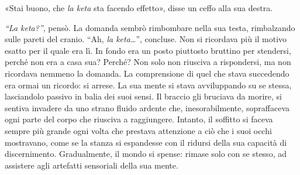 «Stai buono, che \textit{la keta} sta facendo effetto», disse un ceffo alla sua destra.

\textit{``La keta?''}, pensò. La domanda sembrò rimbombare nella sua testa, rimbalzando sulle pareti del cranio. ``Ah, \textit{la keta\ldots}'', concluse. Non si ricordava più il motivo esatto per il quale era lì. In fondo era un posto piuttosto bruttino per stendersi, perché non era a casa sua? Perché? Non solo non riusciva a rispondersi, ma non ricordava nemmeno la domanda. La comprensione di quel che stava succedendo era ormai un ricordo: si arrese. La sua mente si stava avviluppando su se stessa, lasciandolo passivo in balia dei suoi sensi. Il braccio gli bruciava da morire, si sentiva invadere da uno strano fluido ardente che, inesorabilmente, sopraffaceva ogni parte del corpo che riusciva a raggiungere. Intanto, il soffitto si faceva sempre più grande ogni volta che prestava attenzione a ciò che i suoi occhi mostravano, come se la stanza si espandesse con il ridursi della sua capacità di discernimento. Gradualmente, il mondo si spense: rimase solo con se stesso, ad assistere agli artefatti sensoriali della sua mente.
